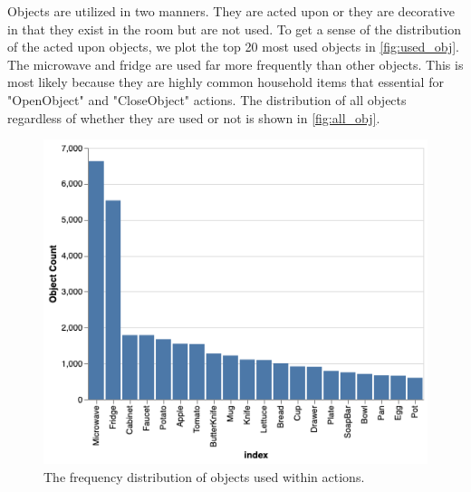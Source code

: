 \documentclass[11pt,a4paper]{article}
\begin{document}
Objects are utilized in two manners. They are acted upon or they are decorative in that they exist in the room but are not used. To get a sense of the distribution of the acted upon objects, we plot the top 20 most used objects in \autoref{fig:used_obj}. The microwave and fridge are used far more frequently than other objects. This is most likely because they are highly common household items that essential for "OpenObject" and "CloseObject" actions. The distribution of all objects regardless of whether they are used or not is shown in \autoref{fig:all_obj}.

\begin{figure}
    \centering
    \includegraphics[width=\linewidth]{Reports/1-Task-Definition-and-Data/used_objects.png}
    \caption{The frequency distribution of objects used within actions.}
    \label{fig:used_obj}
\end{figure}
\end{document}
